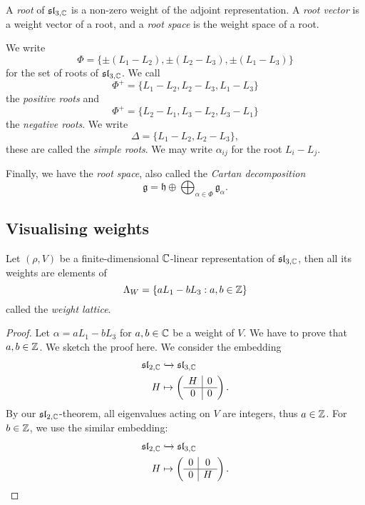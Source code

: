 \begin{definition}
    A \emph{root} of $\mathfrak{sl}_{3, \mathbb C}$ is a non-zero weight of the adjoint representation. A \emph{root vector} is a weight vector of a root, and a \emph{root space} is the weight space of a root.
\end{definition}

We write
\[ \Phi = \{\pm(L_1 - L_2), \pm(L_2 - L_3), \pm(L_1 - L_3)\} \]
for the set of roots of $\mathfrak{sl}_{3, \mathbb C}$. We call
\[ \Phi^+ = \{L_1 - L_2, L_2 - L_3, L_1 - L_3\} \]
the \emph{positive roots} and
\[ \Phi^+ = \{L_2 - L_1, L_3 - L_2, L_3 - L_1\} \]
the \emph{negative roots}. We write
\[ \Delta = \{L_1 - L_2, L_2 - L_3\}, \]
these are called the \emph{simple roots}. We may write $\alpha_{ij}$ for the root $L_i - L_j$.

Finally, we have the \emph{root space}, also called the \emph{Cartan decomposition}
\[ \mathfrak g = \mathfrak h \oplus \bigoplus_{\alpha \in \Phi} \mathfrak g_\alpha. \]

\subsection{Visualising weights}

\begin{theorem}
    Let $(\rho, V)$ be a finite-dimensional $\mathbb C$-linear representation of $\mathfrak{sl}_{3, \mathbb C}$, then all its weights are elements of
    \[
        \Lambda_W = \left\{
        aL_1 - bL_3: a,b \in \mathbb Z
        \right\}
    \]
    called the \emph{weight lattice}.
\end{theorem}

\begin{proof}
    Let $\alpha = aL_1 - bL_3$ for $a,b \in \mathbb C$ be a weight of $V$. We have to prove that $a, b \in \mathbb Z$. We sketch the proof here. We consider the embedding
    \begin{align*}
        \mathfrak{sl}_{2, \mathbb C} & \xhookrightarrow{} \mathfrak{sl}_{3, \mathbb C} \\
        H &\mapsto \left(
            \begin{array}{c|c}
                H & 0 \\ \hline
                0 & 0 \\
            \end{array}
        \right).
    \end{align*}
    By our $\mathfrak{sl}_{2, \mathbb C}$-theorem, all eigenvalues acting on $V$ are integers, thus $a \in \mathbb Z$. For $b \in \mathbb Z$, we use the similar embedding:
    \begin{align*}
        \mathfrak{sl}_{2, \mathbb C} & \xhookrightarrow{} \mathfrak{sl}_{3, \mathbb C} \\
        H &\mapsto \left(
            \begin{array}{c|c}
                0 & 0 \\ \hline
                0 & H \\
            \end{array}
        \right).
    \end{align*}
\end{proof}

